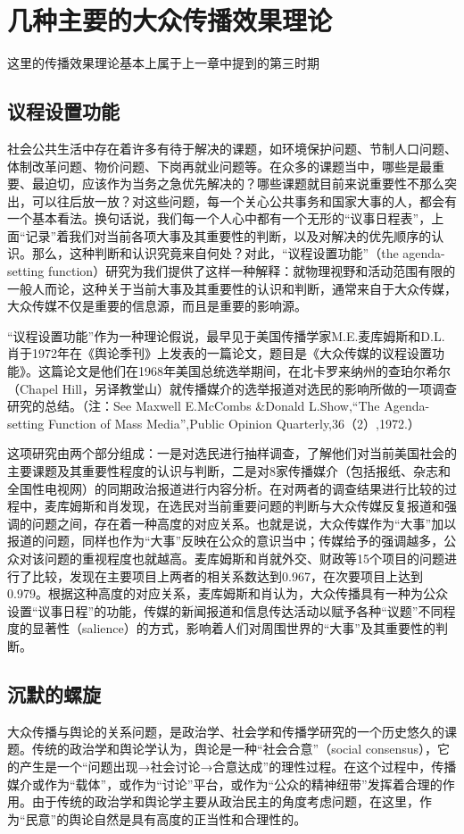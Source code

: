 \documentclass[UTF8,12pt]{ctexart}
\numberwithin{equation}{section} %
\numberwithin{figure}{section}
\numberwithin{table}{section}
\begin{document}
	\newpage
	
	\section{几种主要的大众传播效果理论}
	这里的传播效果理论基本上属于上一章中提到的第三时期
	
	\subsection{议程设置功能}
	社会公共生活中存在着许多有待于解决的课题，如环境保护问题、节制人口问题、体制改革问题、物价问题、下岗再就业问题等。在众多的课题当中，哪些是最重要、最迫切，应该作为当务之急优先解决的？哪些课题就目前来说重要性不那么突出，可以往后放一放？对这些问题，每一个关心公共事务和国家大事的人，都会有一个基本看法。换句话说，我们每一个人心中都有一个无形的“议事日程表”，上面“记录”着我们对当前各项大事及其重要性的判断，以及对解决的优先顺序的认识。那么，这种判断和认识究竟来自何处？对此，“议程设置功能”（the agenda-setting function）研究为我们提供了这样一种解释：就物理视野和活动范围有限的一般人而论，这种关于当前大事及其重要性的认识和判断，通常来自于大众传媒，大众传媒不仅是重要的信息源，而且是重要的影响源。
	
	“议程设置功能”作为一种理论假说，最早见于美国传播学家M.E.麦库姆斯和D.L.肖于1972年在《舆论季刊》上发表的一篇论文，题目是《大众传媒的议程设置功能》。这篇论文是他们在1968年美国总统选举期间，在北卡罗来纳州的查珀尔希尔（Chapel Hill，另译教堂山）就传播媒介的选举报道对选民的影响所做的一项调查研究的总结。（注：See Maxwell E.McCombs \&Donald L.Show,“The Agenda-setting Function of Mass Media”,Public Opinion Quarterly,36（2）,1972.）
	
	这项研究由两个部分组成：一是对选民进行抽样调查，了解他们对当前美国社会的主要课题及其重要性程度的认识与判断，二是对8家传播媒介（包括报纸、杂志和全国性电视网）的同期政治报道进行内容分析。在对两者的调查结果进行比较的过程中，麦库姆斯和肖发现，在选民对当前重要问题的判断与大众传媒反复报道和强调的问题之间，存在着一种高度的对应关系。也就是说，大众传媒作为“大事”加以报道的问题，同样也作为“大事”反映在公众的意识当中；传媒给予的强调越多，公众对该问题的重视程度也就越高。麦库姆斯和肖就外交、财政等15个项目的问题进行了比较，发现在主要项目上两者的相关系数达到0.967，在次要项目上达到0.979。根据这种高度的对应关系，麦库姆斯和肖认为，大众传播具有一种为公众设置“议事日程”的功能，传媒的新闻报道和信息传达活动以赋予各种“议题”不同程度的显著性（salience）的方式，影响着人们对周围世界的“大事”及其重要性的判断。
	
	\subsection{沉默的螺旋}
	大众传播与舆论的关系问题，是政治学、社会学和传播学研究的一个历史悠久的课题。传统的政治学和舆论学认为，舆论是一种“社会合意”（social consensus），它的产生是一个“问题出现→社会讨论→合意达成”的理性过程。在这个过程中，传播媒介或作为“载体”，或作为“讨论”平台，或作为“公众的精神纽带”发挥着合理的作用。由于传统的政治学和舆论学主要从政治民主的角度考虑问题，在这里，作为“民意”的舆论自然是具有高度的正当性和合理性的。
	
\end{document}
